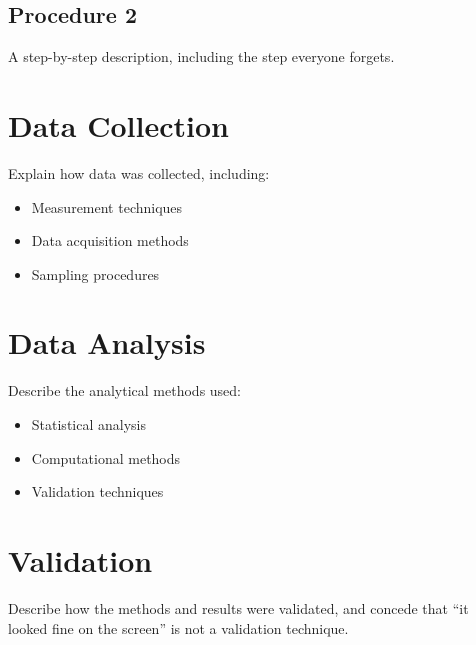 \subsection{Procedure 2}

A step-by-step description, including the step everyone forgets.

\section{Data Collection}

Explain how data was collected, including:

\begin{itemize}
  \item Measurement techniques
  \item Data acquisition methods
  \item Sampling procedures
\end{itemize}

\section{Data Analysis}

Describe the analytical methods used:

\begin{itemize}
  \item Statistical analysis
  \item Computational methods
  \item Validation techniques
\end{itemize}

\section{Validation}

Describe how the methods and results were validated, and concede that
``it looked fine on the screen'' is not a validation technique.
